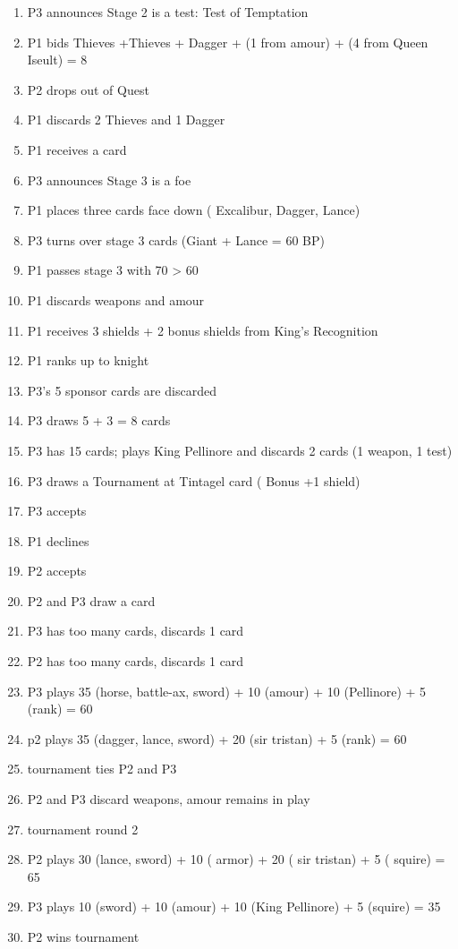 \documentclass[a4paper,11pt]{article}
\begin{document}
\begin{enumerate}
\item P3 announces Stage 2 is a test: Test of Temptation
\item P1 bids Thieves +Thieves + Dagger + (1 from amour) + (4 from Queen Iseult) = 8
\item P2 drops out of Quest
\item P1 discards 2 Thieves and 1 Dagger
\item P1 receives a card
\item P3 announces Stage 3 is a foe
\item P1 places three cards face down ( Excalibur, Dagger, Lance)
\item P3 turns over stage 3 cards (Giant + Lance = 60 BP)
\item P1 passes stage 3 with 70 > 60
\item P1 discards weapons and amour
\item P1 receives 3 shields + 2 bonus shields from King’s Recognition
\item P1 ranks up to knight 
\item P3’s 5 sponsor cards are discarded
\item P3 draws 5 + 3 = 8 cards
\item P3 has 15 cards; plays King Pellinore and discards 2 cards (1 weapon, 1 test)
\item P3 draws a Tournament at Tintagel card ( Bonus +1 shield)
\item P3 accepts
\item P1 declines
\item P2 accepts
\item P2 and P3 draw a card
\item P3 has too many cards, discards 1 card 
\item P2 has too many cards, discards 1 card 
\item P3 plays 35 (horse, battle-ax, sword) + 10 (amour) + 10 (Pellinore) + 5 (rank) = 60
\item p2 plays 35 (dagger, lance, sword)  + 20 (sir tristan) + 5 (rank) = 60
\item tournament ties P2 and P3
\item P2 and P3 discard weapons, amour remains in play
\item tournament round 2
\item P2 plays 30 (lance, sword) + 10 ( armor) + 20 ( sir tristan) + 5 ( squire) = 65 
\item P3 plays 10 (sword) + 10 (amour) + 10 (King Pellinore) + 5 (squire) = 35
\item P2 wins tournament

\end{enumerate}
\end{document}
